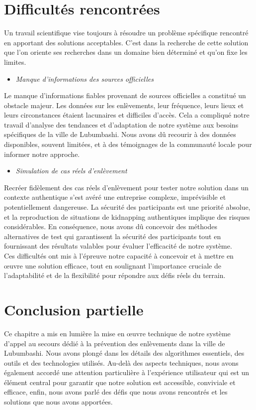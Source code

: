 \section{Difficultés rencontrées}
Un travail scientifique vise toujours à résoudre un problème spécifique rencontré en apportant des solutions acceptables. C’est dans la recherche de cette solution que l’on oriente ses recherches dans un domaine bien déterminé et qu’on fixe les limites.

\begin{itemize}
	\item \textit{Manque d'informations des sources officielles }
\end{itemize}

Le manque d'informations fiables provenant de sources officielles a constitué un obstacle majeur. Les données sur les enlèvements, leur fréquence, leurs lieux et leurs circonstances étaient lacunaires et difficiles d'accès. Cela a compliqué notre travail d'analyse des tendances et d'adaptation de notre système aux besoins spécifiques de la ville de Lubumbashi. Nous avons dû recourir à des données disponibles, souvent limitées, et à des témoignages de la communauté locale pour informer notre approche.

\begin{itemize}
	\item \textit{Simulation de cas réels d’enlèvement}
\end{itemize}

Recréer fidèlement des cas réels d'enlèvement pour tester notre solution dans un contexte authentique s'est avéré une entreprise complexe, imprévisible et potentiellement dangereuse. La sécurité des participants est une priorité absolue, et la reproduction de situations de kidnapping authentiques implique des risques considérables. En conséquence, nous avons dû concevoir des méthodes alternatives de test qui garantissent la sécurité des participants tout en fournissant des résultats valables pour évaluer l'efficacité de notre système.\\

Ces difficultés ont mis à l'épreuve notre capacité à concevoir et à mettre en œuvre une solution efficace, tout en soulignant l'importance cruciale de l'adaptabilité et de la flexibilité pour répondre aux défis réels du terrain.

\section{ Conclusion partielle}
Ce chapitre a mis en lumière la mise en œuvre technique de notre système d'appel au secours dédié à la prévention des enlèvements dans la ville de Lubumbashi. Nous avons plongé dans les détails des algorithmes essentiels, des outils et des technologies utilisés. Au-delà des aspects techniques, nous avons également accordé une attention particulière à l'expérience utilisateur qui est un élément central pour garantir que notre solution est accessible, conviviale et efficace, enfin, nous avons parlé des défis que nous avons rencontrés et les solutions que nous avons apportées.
